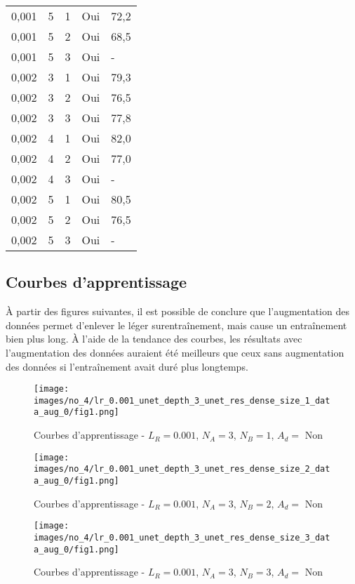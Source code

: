 \begin{longtable}{p{4cm}p{1cm}p{1cm}p{3.5cm}p{4cm}}
        0,001 & 5 & 1 & Oui & 72,2\\
        0,001 & 5 & 2 & Oui & 68,5\\
        0,001 & 5 & 3 & Oui & -\\
        
        0,002 & 3 & 1 & Oui & 79,3\\
        0,002 & 3 & 2 & Oui & 76,5\\
        0,002 & 3 & 3 & Oui & 77,8\\
        
        0,002 & 4 & 1 & Oui & 82,0\\
        0,002 & 4 & 2 & Oui & 77,0\\
        0,002 & 4 & 3 & Oui & -\\
        
        0,002 & 5 & 1 & Oui & 80,5\\
        0,002 & 5 & 2 & Oui & 76,5\\
        0,002 & 5 & 3 & Oui & -\\            
        \hline
    \end{longtable}

\subsection{Courbes d'apprentissage}
    À partir des figures suivantes, il est possible de conclure que l'augmentation des données permet d'enlever le léger surentraînement, mais cause un entraînement bien plus long. À l'aide de la tendance des courbes, les résultats avec l'augmentation des données auraient été meilleurs que ceux sans augmentation des données si l'entraînement avait duré plus longtemps.

    \begin{figure}[H]
        \centering 
        \texttt{[image: images/no\_4/lr\_0.001\_unet\_depth\_3\_unet\_res\_dense\_size\_1\_data\_aug\_0/fig1.png]}
        \caption{Courbes d’apprentissage - \(L_R=0.001\), \(N_A=3\), \(N_B=1\), \(A_d= \) Non}
    \end{figure}

    \begin{figure}[H]
        \centering 
        \texttt{[image: images/no\_4/lr\_0.001\_unet\_depth\_3\_unet\_res\_dense\_size\_2\_data\_aug\_0/fig1.png]}
        \caption{Courbes d’apprentissage - \(L_R=0.001\), \(N_A=3\), \(N_B=2\), \(A_d= \) Non}
    \end{figure}

    \begin{figure}[H]
        \centering 
        \texttt{[image: images/no\_4/lr\_0.001\_unet\_depth\_3\_unet\_res\_dense\_size\_3\_data\_aug\_0/fig1.png]}
        \caption{Courbes d’apprentissage - \(L_R=0.001\), \(N_A=3\), \(N_B=3\), \(A_d= \) Non}
    \end{figure}

